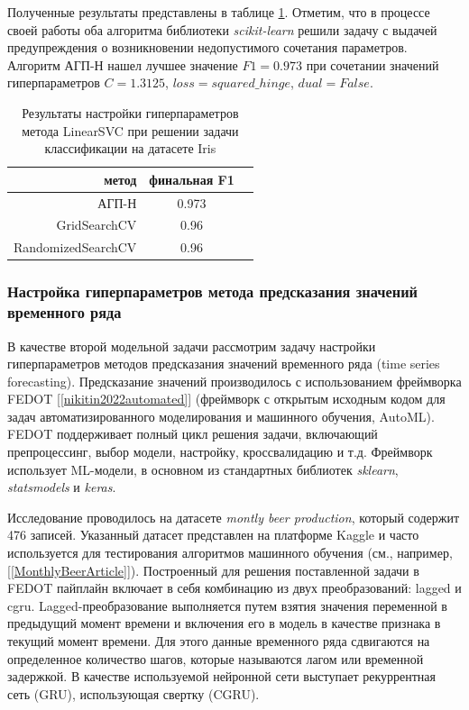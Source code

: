 \documentclass[a4paper,12pt,russian]{article}
\begin{document}
Полученные результаты представлены в таблице \ref{tab22}. Отметим, что в процессе своей работы оба алгоритма библиотеки \textit{scikit-learn} решили задачу с выдачей предупреждения о возникновении недопустимого сочетания параметров. Алгоритм АГП-Н нашел лучшее значение $F1 = 0.973$ при сочетании значений гиперпараметров $C=1.3125$, $loss=squared\_hinge$, $dual = False$.

\begin{table}[h!]
\centering
\caption{Результаты настройки гиперпараметров метода LinearSVC при решении задачи классификации на датасете Iris}\label{tab22}
\begin{tabular}{|r|c|c|}
\hline
метод & финальная F1 \\
\hline \hline
АГП-Н & 0.973 \\
\hline
GridSearchCV & 0.96 \\
\hline
RandomizedSearchCV & 0.96 \\
\hline
\end{tabular}
\end{table}


\subsubsection{Настройка гиперпараметров метода предсказания значений временного ряда }

В качестве второй модельной задачи рассмотрим задачу настройки гиперпараметров методов предсказания значений временного ряда (time series forecasting). Предсказание значений производилось с использованием фреймворка FEDOT [\ref{nikitin2022automated}]
(фреймворк с открытым исходным кодом для задач автоматизированного моделирования и машинного обучения, AutoML). FEDOT поддерживает полный цикл решения задачи, включающий препроцессинг, выбор модели, настройку, кроссвалидацию и т.д. Фреймворк использует ML-модели, в основном из стандартных библиотек \textit{sklearn}, \textit{statsmodels} и \textit{keras}.

Исследование проводилось на датасете \textit{montly beer production}, который содержит 476 записей. %
Указанный датасет представлен на платформе Kaggle и часто используется для тестирования алгоритмов машинного обучения (см., например, [\ref{MonthlyBeerArticle}]).
Построенный для решения поставленной задачи в FEDOT пайплайн включает в себя комбинацию из двух преобразований: lagged и cgru. Lagged-преобразование выполняется путем взятия значения переменной в предыдущий момент времени и включения его в модель в качестве признака в текущий момент времени. Для этого данные временного ряда сдвигаются на определенное количество шагов, которые называются лагом или временной задержкой. В качестве используемой нейронной сети выступает рекуррентная сеть (GRU), использующая свертку (CGRU).
\end{document}
